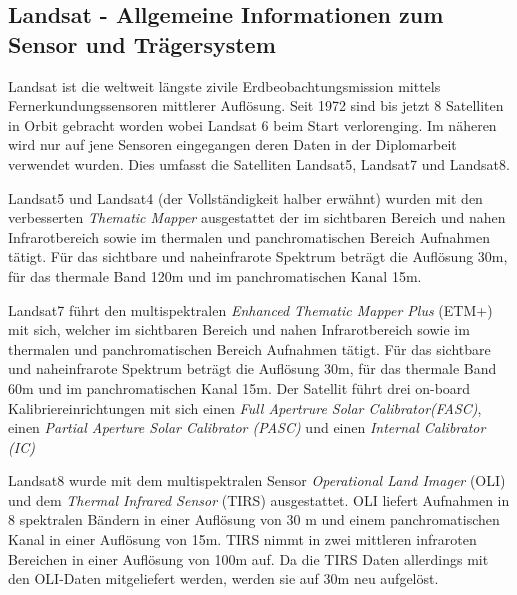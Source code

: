 \documentclass[11pt]{report}
\begin{document}
\subsection{Landsat - Allgemeine Informationen zum Sensor und Trägersystem}
Landsat ist die weltweit längste zivile Erdbeobachtungsmission mittels Fernerkundungssensoren  mittlerer Auflösung. Seit 1972 sind bis jetzt 8 Satelliten in Orbit gebracht worden wobei Landsat 6 beim Start verlorenging. Im näheren wird nur auf jene Sensoren eingegangen deren Daten in der Diplomarbeit verwendet wurden. Dies umfasst die Satelliten Landsat5, Landsat7 und Landsat8.

Landsat5 und Landsat4 (der Vollständigkeit halber erwähnt) wurden mit den verbesserten \textit{Thematic Mapper} ausgestattet der im sichtbaren Bereich und nahen Infrarotbereich sowie im thermalen und panchromatischen Bereich Aufnahmen tätigt. Für das sichtbare und naheinfrarote Spektrum beträgt die Auflösung 30m, für das thermale Band 120m und im panchromatischen Kanal 15m.

Landsat7 führt den multispektralen \textit{Enhanced Thematic Mapper Plus} (ETM+) mit sich, welcher im sichtbaren Bereich und nahen Infrarotbereich sowie im thermalen und panchromatischen Bereich Aufnahmen tätigt. Für das sichtbare und naheinfrarote Spektrum beträgt die Auflösung 30m, für das thermale Band 60m und im panchromatischen Kanal 15m.
Der Satellit führt drei on-board Kalibriereinrichtungen mit sich einen \textit{Full Apertrure Solar Calibrator(FASC)}, einen \textit{Partial Aperture Solar Calibrator (PASC)} und einen \textit{Internal Calibrator (IC)}

Landsat8 wurde mit dem multispektralen Sensor \textit{Operational Land Imager} (OLI) und dem \textit{Thermal Infrared Sensor} (TIRS) ausgestattet. OLI liefert Aufnahmen in 8 spektralen Bändern in einer Auflösung von 30 m und einem panchromatischen Kanal in einer Auflösung von 15m. TIRS nimmt in zwei mittleren infraroten Bereichen in einer Auflösung von 100m auf. Da die TIRS Daten allerdings mit den OLI-Daten mitgeliefert werden, werden sie auf 30m neu aufgelöst.
\end{document}
